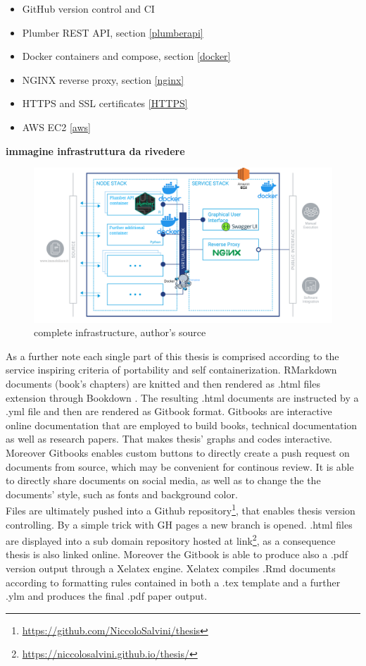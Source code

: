 \documentclass[
  12pt,
  a4paper,
  oneside]{book}
\DeclareRobustCommand{\href}[2]{#2\footnote{\url{#1}}}
\providecommand{\tightlist}{%
  \setlength{\itemsep}{0pt}\setlength{\parskip}{0pt}}
\theoremstyle{definition}
\theoremstyle{definition}
\theoremstyle{definition}
\theoremstyle{remark}
\begin{document}
\begin{itemize}
\tightlist
\item
  GitHub version control and CI
\item
  Plumber REST API, section \ref{plumberapi}
\item
  Docker containers and compose, section \ref{docker}
\item
  NGINX reverse proxy, section \ref{nginx}
\item
  HTTPS and SSL certificates \ref{HTTPS}
\item
  AWS EC2 \ref{aws}
\end{itemize}

\textbf{immagine infrastruttura da rivedere}

\begin{figure}
\centering
\includegraphics{images/software_arch.jpg.png}
\caption{\label{fig:CompleteStructure}complete infrastructure, author's source}
\end{figure}

As a further note each single part of this thesis is comprised according to the service inspiring criteria of portability and self containerization. RMarkdown \citep{rmarkdown1} documents (book's chapters) are knitted and then rendered as .html files extension through Bookdown \citep{bookdown2}. The resulting .html documents are instructed by a .yml file and then are rendered as Gitbook format. Gitbooks are interactive online documentation that are employed to build books, technical documentation as well as research papers. That makes thesis' graphs and codes interactive. Moreover Gitbooks enables custom buttons to directly create a push request on documents from source, which may be convenient for continous review. It is able to directly share documents on social media, as well as to change the the documents' style, such as fonts and background color.\\
Files are ultimately pushed into a \href{https://github.com/NiccoloSalvini/thesis}{Github repository}, that enables thesis version controlling. By a simple trick with GH pages a new branch is opened. .html files are displayed into a sub domain repository hosted at \href{https://niccolosalvini.github.io/thesis/}{link}, as a consequence thesis is also linked online. Moreover the Gitbook is able to produce also a .pdf version output through a Xelatex engine. Xelatex compiles .Rmd documents according to formatting rules contained in both a .tex template and a further .ylm and produces the final .pdf paper output.
\end{document}
